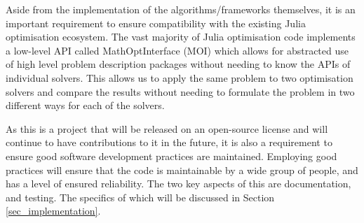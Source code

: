 Aside from the implementation of the algorithms/frameworks themselves, it is an important requirement to ensure compatibility with the existing Julia optimisation ecosystem. The vast majority of Julia optimisation code implements a low-level API called MathOptInterface (MOI) \cite{ManualMathOptInterface} which allows for abstracted use of high level problem description packages without needing to know the APIs of individual solvers. This allows us to apply the same problem to two optimisation solvers and compare the results without needing to formulate the problem in two different ways for each of the solvers. 

As this is a project that will be released on an open-source license and will continue to have contributions to it in the future, it is also a requirement to ensure good software development practices are maintained. Employing good practices will ensure that the code is maintainable by a wide group of people, and has a level of ensured reliability. The two key aspects of this are documentation, and testing. The specifics of which will be discussed in Section \ref{sec_implementation}.
